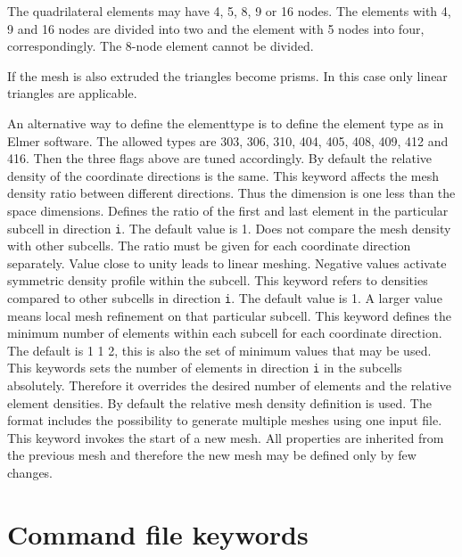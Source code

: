 The quadrilateral elements may have 4, 5, 8, 9 or 16 nodes. The 
elements with 4, 9  and 16 nodes are divided into two and the element with
5 nodes into four, correspondingly. The 8-node element cannot be divided.

If the mesh is also extruded the triangles become prisms. In this case
only linear triangles are applicable.


An alternative way to define the elementtype is to define the 
element type as in Elmer software.
The allowed types are 303, 306, 310, 404, 405, 408, 409,
412 and 416. Then the three flags above are tuned accordingly.
%
By default the relative density of the coordinate 
directions is the same. This keyword affects the 
mesh density ratio between different directions.
Thus the dimension is one less than the space dimensions.
%
Defines the ratio of the first and last element in the particular
subcell in direction \texttt{i}. The default value is 1.
Does not compare the mesh density with other subcells.
The ratio must be given for each coordinate direction 
separately. Value close to unity leads to linear meshing.
Negative values activate symmetric density profile within the subcell. 
%
This keyword refers 
to densities compared to other subcells in direction \texttt{i}.
The default value is 1. A larger value means local 
mesh refinement on that particular subcell.
%
This keyword defines the minimum number of elements 
within each subcell for each coordinate direction.
The default is 1 1 2, this is also the set of minimum values
that may be used.
%
This keywords sets the number of elements in direction \texttt{i} in the subcells
absolutely. Therefore it overrides the desired number of elements
and the relative element densities. By default the relative 
mesh density definition is used. 
%
The format includes the possibility to generate multiple
meshes using one input file. This keyword invokes the 
start of a new mesh. All properties are inherited from the 
previous mesh and therefore the new mesh may be 
defined only by few changes.
\sifend



\section{Command file keywords}

